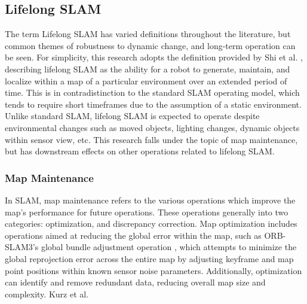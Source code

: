 \subsection{Lifelong SLAM}

The term Lifelong SLAM has varied definitions throughout the literature, but common themes of robustness to dynamic change, and long-term operation can be seen. For simplicity, this research adopts the definition provided by Shi et al. \cite{shiAreWeReady2020}, describing lifelong SLAM as the ability for a robot to generate, maintain, and localize within a map of a particular environment over an extended period of time. This is in contradistinction to the standard SLAM operating model, which tends to require short timeframes due to the assumption of a static environment. Unlike standard SLAM, lifelong SLAM is expected to operate despite environmental changes such as moved objects, lighting changes, dynamic objects within sensor view, etc. This research falls under the topic of map maintenance, but has downstream effects on other operations related to lifelong SLAM.

\subsubsection{Map Maintenance}

In SLAM, map maintenance refers to the various operations which improve the map's performance for future operations. These operations generally into two categories: optimization, and discrepancy correction. Map optimization includes operations aimed at reducing the global error within the map, such as ORB-SLAM3's global bundle adjustment operation \cite{camposORBSLAM3AccurateOpenSource2021}, which attempts to minimize the global reprojection error across the entire map by adjusting keyframe and map point positions within known sensor noise parameters. Additionally, optimization can identify and remove redundant data, reducing overall map size and complexity. Kurz et al. 